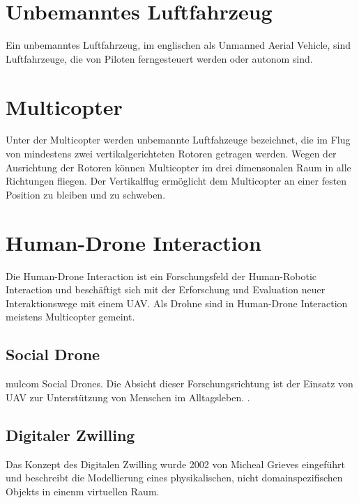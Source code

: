 
\section{Unbemanntes Luftfahrzeug}
Ein unbemanntes Luftfahrzeug, im englischen als Unmanned Aerial Vehicle, sind Luftfahrzeuge, die von Piloten ferngesteuert werden oder autonom sind. 

\section{Multicopter}
Unter der Multicopter werden unbemannte Luftfahzeuge bezeichnet, die im Flug von mindestens zwei vertikalgerichteten Rotoren getragen werden. Wegen der Ausrichtung der Rotoren können Multicopter im drei dimensonalen Raum in alle Richtungen fliegen. Der Vertikalflug ermöglicht dem Multicopter an einer festen Position zu bleiben und zu schweben.


\section{Human-Drone Interaction}
Die Human-Drone Interaction ist ein Forschungsfeld der Human-Robotic Interaction \cite{Tezza2019TheStaOfArtHumDro}
und beschäftigt sich mit der Erforschung und Evaluation neuer Interaktionswege mit einem UAV. Als Drohne sind in Human-Drone Interaction meistens Multicopter gemeint.

\subsection{Social Drone}
mulcom{
Social Drones. Die Absicht dieser Forschungsrichtung ist der Einsatz von UAV zur Unterstützung von Menschen im Alltagsleben. \cite{Ghafu2021SocCom}.}

\subsection{Digitaler Zwilling}

Das Konzept des Digitalen Zwilling wurde 2002 von Micheal Grieves eingeführt und beschreibt die Modellierung eines physikalischen, nicht domainspezifischen Objekts in einenm virtuellen Raum.  

